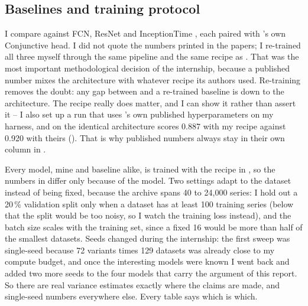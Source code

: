 \subsection{Baselines and training protocol}
\label{sec:setup:baselines}

I compare against FCN, ResNet \citep{wang2017fcn} and InceptionTime \citep{fawaz2020inceptiontime},
each paired with \millet{}'s own Conjunctive head. I did not quote the numbers printed in the
papers; I re-trained all three myself through the same pipeline and the same recipe as \seanet{}.
That was the most important methodological decision of the internship, because a published number
mixes the architecture with whatever recipe its authors used. Re-training removes the doubt: any gap
between \seanet{} and a re-trained baseline is down to the architecture. The recipe really does
matter, and I can show it rather than assert it -- I also set up a run that uses \millet{}'s own
published hyperparameters on my harness, and on \webtraffic{} the identical architecture scores
0.887 with my recipe against 0.920 with theirs (). That is why published
\millet{} numbers always stay in their own column in .

\label{sec:setup:protocol}
Every model, mine and baseline alike, is trained with the recipe in , so the
numbers in  differ only because of the model.
Two settings adapt to the dataset instead of being fixed, because the \ucr{} archive spans 40 to
24{,}000 series: I hold out a 20\,\% validation split only when a dataset has at least 100 training
series (below that the split would be too noisy, so I watch the training loss instead), and the
batch size scales with the training set, since a fixed 16 would be more than half of the smallest
\ucr{} datasets. Seeds changed during the internship: the first sweep was single-seed because 72
variants times 129 datasets was already close to my compute budget, and once the interesting models
were known I went back and added two more seeds to the four models that carry the argument of this
report. So there are real variance estimates exactly where the claims are made, and single-seed
numbers everywhere else. Every table says which is which.

